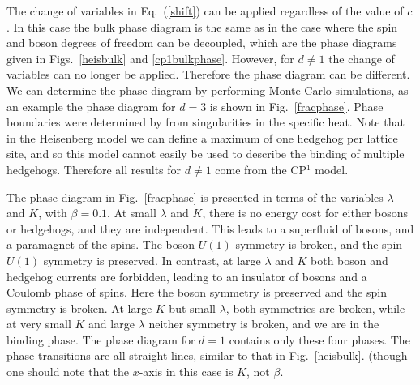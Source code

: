 \documentclass[prb,twocolumn]{revtex4-1}
\begin{document}
The change of variables in Eq.~(\ref{shift}) can be applied regardless of the value of $c$. In this case the bulk phase diagram is the same as in the case where the spin and boson degrees of freedom can be decoupled, which are the phase diagrams given in Figs.~\ref{heisbulk} and \ref{cp1bulkphase}. However, for $d\neq1$ the change of variables can no longer be applied. Therefore the phase diagram can be different. We can determine the phase diagram by performing Monte Carlo simulations, as an example the phase diagram for $d=3$ is shown in Fig.~\ref{fracphase}. Phase boundaries were determined by from singularities in the specific heat. Note that in the Heisenberg model we can define a maximum of one hedgehog per lattice site, and so this model cannot easily be used to describe the binding of  multiple hedgehogs. Therefore all results for $d \neq 1$ come from the CP$^1$ model. 

The phase diagram in Fig.~\ref{fracphase} is presented in terms of the variables $\lambda$ and $K$, with $\beta=0.1$. 
At small $\lambda$ and $K$, there is no energy cost for either bosons or hedgehogs, and they are independent. This leads to a superfluid of bosons, and a paramagnet of the spins. The boson $U(1)$ symmetry is broken, and the spin $U(1)$ symmetry is preserved. In contrast, at large $\lambda$ and $K$ both boson and hedgehog currents are forbidden, leading to an insulator of bosons and a Coulomb phase of spins. Here the boson symmetry is preserved and the spin symmetry is broken. At large $K$ but small $\lambda$, both symmetries are broken, while at very small $K$ and large $\lambda$ neither symmetry is broken, and we are in the binding phase. The phase diagram for $d=1$ contains only these four phases. The phase transitions are all straight lines,  similar to that in Fig.~\ref{heisbulk}. (though one should note that the $x$-axis in this case is $K$, not $\beta$. 
\end{document}
